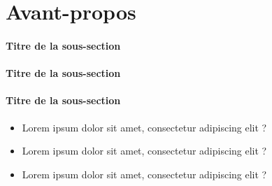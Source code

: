 \chapter*{Avant-propos} %


\lipsum[66]


\subsubsection*{Titre de la sous-section}

\lipsum[66]

\lipsum[70]


\subsubsection*{Titre de la sous-section}

\lipsum[70]


\subsubsection*{Titre de la sous-section}

\lipsum[66]

\begin{itemize}
    \item Lorem ipsum dolor sit amet, consectetur adipiscing elit ?
    \item Lorem ipsum dolor sit amet, consectetur adipiscing elit ? 
    \item Lorem ipsum dolor sit amet, consectetur adipiscing elit ?
\end{itemize}

\lipsum[70]
